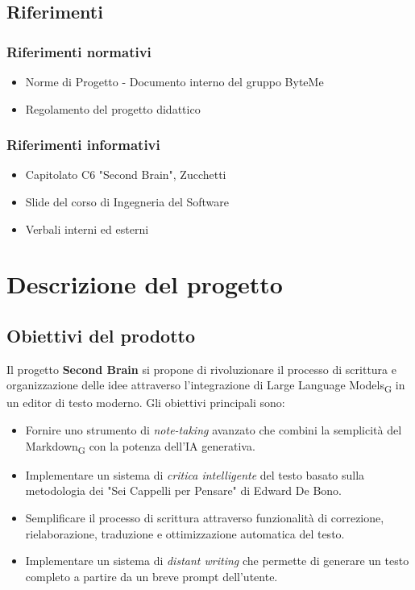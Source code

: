 \documentclass[11pt,a4paper]{article}
\begin{document}
\subsection{Riferimenti}
\subsubsection{Riferimenti normativi}
\begin{itemize}
    \item Norme di Progetto - Documento interno del gruppo ByteMe
    \item Regolamento del progetto didattico
\end{itemize}

\subsubsection{Riferimenti informativi}
\begin{itemize}
    \item Capitolato C6 "Second Brain", Zucchetti
    \item Slide del corso di Ingegneria del Software
    \item Verbali interni ed esterni
\end{itemize}

\newpage

\section{Descrizione del progetto}
\subsection{Obiettivi del prodotto}
Il progetto \textbf{Second Brain} si propone di rivoluzionare il processo di scrittura e organizzazione delle idee attraverso l'integrazione di Large Language Models\textsubscript{G} in un editor di testo moderno. Gli obiettivi principali sono:

\begin{itemize}
    \item Fornire uno strumento di \textit{note-taking} avanzato che combini la semplicità del Markdown\textsubscript{G} con la potenza dell'IA generativa.
    \item Implementare un sistema di \textit{critica intelligente} del testo basato sulla metodologia dei "Sei Cappelli per Pensare" di Edward De Bono.
    \item Semplificare il processo di scrittura attraverso funzionalità di correzione, rielaborazione, traduzione e ottimizzazione automatica del testo.
    \item Implementare un sistema di \textit{distant writing} che permette di generare un testo completo a partire da un breve prompt dell'utente.
\end{itemize}
\end{document}
